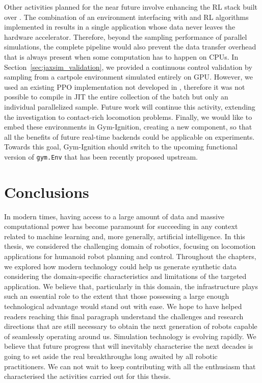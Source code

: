 Other activities planned for the near future involve enhancing the \ac{RL} stack built over \jaxsim.
The combination of an environment interfacing with \jaxsim and \ac{RL} algorithms implemented in \jax results in a single application whose data never leaves the hardware accelerator.
Therefore, beyond the sampling performance of parallel simulations, the complete pipeline would also prevent the data transfer overhead that is always present when some computation has to happen on \acp{CPU}.
In Section~\ref{sec:jaxsim_validation}, we provided a continuous control validation by sampling from a cartpole environment simulated entirely on \ac{GPU}.
However, we used an existing \ac{PPO} implementation not developed in \jax, therefore it was not possible to compile in \ac{JIT} the entire collection of the batch but only an individual parallelized sample.
Future work will continue this activity, extending the investigation to contact-rich locomotion problems.
Finally, we would like to embed these environments in Gym-Ignition, creating a new \jaxsim \scenario component, so that all the benefits of future real-time backends could be applicable on \jaxsim experiments.
Towards this goal, Gym-Ignition should switch to the upcoming functional version of \verb|gym.Env| that has been recently proposed upstream. 

\vfill
\section*{Conclusions}

In modern times, having access to a large amount of data and massive computational power has become paramount for succeeding in any context related to machine learning and, more generally, artificial intelligence.
In this thesis, we considered the challenging domain of robotics, focusing on locomotion applications for humanoid robot planning and control.
Throughout the chapters, we explored how modern technology could help us generate synthetic data considering the domain-specific characteristics and limitations of the targeted application.
We believe that, particularly in this domain, the infrastructure plays such an essential role to the extent that those possessing a large enough technological advantage would stand out with ease.
We hope to have helped readers reaching this final paragraph understand the challenges and research directions that are still necessary to obtain the next generation of robots capable of seamlessly operating around us.
Simulation technology is evolving rapidly.
We believe that future progress that will inevitably characterise the next decades is going to set aside the real breakthroughs long awaited by all robotic practitioners.
We can not wait to keep contributing with all the enthusiasm that characterised the activities carried out for this thesis.
